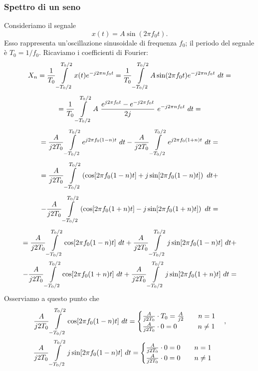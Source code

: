 \documentclass[12pt,oneside,openany]{memoir}
\numberwithin{equation}{subsection}
\newcommand{\dt}{\ dt}
\begin{document}
\subsubsection{Spettro di un seno}
Consideriamo il segnale
\begin{equation}
	x(t) = A \sin(2 \pi f_0 t).
\end{equation}
Esso rappresenta un'oscillazione sinusoidale di frequenza $f_0$; il periodo del segnale \`e $T_0 = 1/f_0$. Ricaviamo i coefficienti di Fourier:
\[
	X_n = \frac{1}{T_0} \int\displaylimits_{-T_0/2}^{T_0/2} x(t) e^{-j 2 \pi n f_0 t} = \frac{1}{T_0} \int\displaylimits_{-T_0/2}^{T_0/2} A \sin(2 \pi f_0 t) e^{-j 2 \pi n f_0 t} \dt =
\]
\[
	= \frac{1}{T_0} \int\displaylimits_{-T_0/2}^{T_0/2} A \ \frac{e^{j 2 \pi f_0 t} - e^{-j 2 \pi f_0 t}}{2j} \ e^{-j 2 \pi n f_0 t} \dt =
\]
\[
	= \frac{A}{j 2 T_0} \int\displaylimits_{-T_0/2}^{T_0/2} e^{j 2 \pi f_0 (1 - n) t} \dt - \frac{A}{j 2 T_0} \int\displaylimits_{-T_0/2}^{T_0/2} e^{j 2 \pi f_0 (1 + n) t} \dt =
\]
\[
	= \frac{A}{j 2 T_0} \int\displaylimits_{-T_0/2}^{T_0/2} \left( \cos[2 \pi f_0 (1 - n) t] + j \sin[2 \pi f_0 (1 - n) t] \right) \dt +
\]
\[
	- \frac{A}{j 2 T_0} \int\displaylimits_{-T_0/2}^{T_0/2} \left( \cos[2 \pi f_0 (1 + n) t] - j \sin[2 \pi f_0 (1 + n) t] \right) \dt =
\]
\begin{equation}
	\begin{split}
		= \frac{A}{j 2 T_0} \int\displaylimits_{-T_0/2}^{T_0/2} \cos[2 \pi f_0 (1 - n) t] \dt + \frac{A}{j 2 T_0} \int\displaylimits_{-T_0/2}^{T_0/2} j \sin[2 \pi f_0 (1 - n) t] \dt +
		\\
		- \frac{A}{j 2 T_0} \int\displaylimits_{-T_0/2}^{T_0/2} \cos[2 \pi f_0 (1 + n) t] \dt + \frac{A}{j 2 T_0} \int\displaylimits_{-T_0/2}^{T_0/2} j \sin[2 \pi f_0 (1 + n) t] \dt =
	\end{split}
\end{equation}
Osserviamo a questo punto che
\begin{equation}
	\begin{split}
		\frac{A}{j 2 T_0} \int\displaylimits_{-T_0/2}^{T_0/2} \cos[2 \pi f_0 (1 - n) t] \dt =
			\begin{cases}
				\frac{A}{j 2 T_0} \cdot T_0 = \frac{A}{j 2} \quad\quad n = 1\\
				\frac{A}{j 2 T_0} \cdot 0 = 0 \quad\quad \ \ \ n \neq 1
			\end{cases},
		\\
		\frac{A}{j 2 T_0} \int\displaylimits_{-T_0/2}^{T_0/2} j \sin[2 \pi f_0 (1 - n) t] \dt =
			\begin{cases}
				\frac{A}{j 2 T_0} \cdot 0 = 0 \quad\quad n = 1\\
				\frac{A}{j 2 T_0} \cdot 0 = 0 \quad\quad n \neq 1
			\end{cases}
			\quad
	\end{split}
\end{equation}
\end{document}
